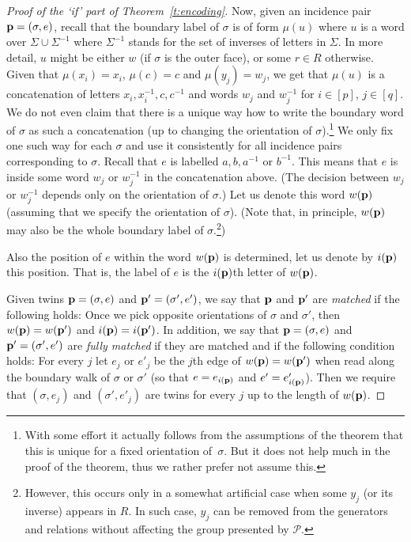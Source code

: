 \documentclass[10pt,a4paper]{article}
\theoremstyle{definition}
\theoremstyle{remark}
\newcommand\PP{\mathcal{P}}
\newcommand\makevec[1]{{\bf #1}}
\def \pp {\makevec{p}}
\begin{document}
\begin{proof}[Proof of the `if' part of Theorem~\ref{t:encoding}]
Now, given an incidence pair $\pp = (\sigma, e)$, recall that the boundary
label of
$\sigma$ is of form $\mu(u)$ where $u$ is a word over $\Sigma \cup \Sigma^{-1}$
where $\Sigma^{-1}$ stands for the set of inverses of letters in $\Sigma$. In more detail,
$u$ might be either $w$ (if $\sigma$ is the outer face), or some $r \in R$
otherwise. Given that $\mu(x_i) = x_i$, $\mu(c) = c$ and $\mu(y_j) =
w_j$, we get that $\mu(u)$ is a concatenation of letters $x_i, x^{-1}_i, c,
c^{-1}$ and words $w_j$ and $w_j^{-1}$ for $i \in [p]$, $j \in [q]$. We do not
even claim that there is a unique way how to write the boundary word of
$\sigma$ as such a concatenation (up to changing the orientation of
$\sigma$).\footnote{With some effort it actually follows from the assumptions
of the theorem that this is unique for a fixed orientation of~$\sigma$. But it
does not help much in the proof of the theorem, thus we rather prefer not
assume this.} We only fix one such way for each $\sigma$ and use it
consistently for all incidence pairs corresponding to $\sigma$. Recall that
$e$ is labelled $a, b, a^{-1}$ or $b^{-1}$. This means that $e$ is inside some
word $w_j$ or $w_j^{-1}$ in the concatenation above. (The decision between $w_j$ or $w_j^{-1}$ depends only on the orientation of $\sigma$.)
Let us denote this word $w(\pp)$
(assuming that we specify the orientation of $\sigma$). (Note that, in
principle, $w(\pp)$ may also be the whole boundary label of
$\sigma$.\footnote{However, this occurs only in a somewhat artificial case when
some $y_j$ (or its inverse) appears in $R$. In such case, $y_j$ can be removed
from the generators and relations without affecting the group presented by
$\PP$.})  

Also the position of $e$ within the word $w(\pp)$ is determined, let
us denote by $i(\pp)$ this position. That is, the label of $e$ is the
$i(\pp)$th letter of $w(\pp)$.

Given twins $\pp = (\sigma, e)$ and $\pp' = (\sigma', e')$, we say that $\pp$
and $\pp'$ are \emph{matched} if the following holds: Once we pick opposite
orientations of $\sigma$ and $\sigma'$, then $w(\pp) = w(\pp')$ and $i(\pp) =
i(\pp')$. In addition, we say that $\pp = (\sigma, e)$ and $\pp' = (\sigma',
e')$ are \emph{fully matched} if they are matched and if the following
condition holds: For every $j$ let $e_j$ or $e'_j$ be the $j$th edge of
$w(\pp) = w(\pp')$ when read along the boundary walk of $\sigma$ or
$\sigma'$ (so that $e = e_{i(\pp)}$ and $e' = e'_{i(\pp)}$). Then we require that $(\sigma, e_j)$ and $(\sigma', e'_j)$ are twins
for every $j$ up to the length of $w(\pp)$.


\end{proof}
\end{document}
